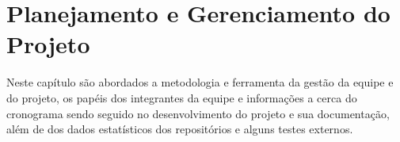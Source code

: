 \chapter{Planejamento e Gerenciamento do Projeto}
Neste capítulo são abordados a metodologia e ferramenta da gestão da equipe e do projeto, os papéis dos integrantes da equipe e informações a cerca do cronograma sendo seguido no desenvolvimento do projeto e sua documentação, além de dos dados estatísticos dos repositórios e alguns testes externos.





